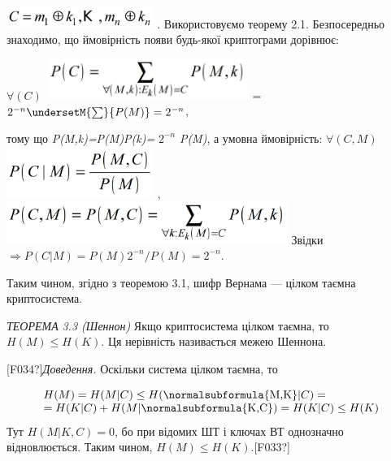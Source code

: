  \includegraphics[width=1.8819in,height=0.2791in]{crypt-img/crypt-img34.png} . 
Використовуємо теорему 2.1. Безпосередньо знаходимо, що ймовірність появи
будь-якої криптограми дорівнює:

{\centering
 $\forall (C)$  
\includegraphics[width=2.5984in,height=0.5189in]{crypt-img/crypt-img35.png} =
$2^{-n}\undersetM{\sum }{P(M)}=2^{-n}$,
\par}

{\centering
тому що
\textit{P}\textit{(}\textit{M}\textit{,}\textit{k}\textit{)=}\textit{P}\textit{(}\textit{M}\textit{)}\textit{P}\textit{(}\textit{k}\textit{)=}
$2^{-n}$ \textit{P}\textit{(}\textit{M}\textit{)},  а  умовна ймовірність: 
$\forall (C,M)$  
\includegraphics[width=1.8862in,height=0.661in]{crypt-img/crypt-img36.png} ,  
\includegraphics[width=3.602in,height=0.539in]{crypt-img/crypt-img37.png} 
Звідки  $\Rightarrow P(C|M)=P(M)2^{-n}/P(M)=2^{-n}$. 
\par}

Таким чином, згідно з теоремою 3.1, шифр Вернама --- цілком таємна криптосистема.


\bigskip

\textit{ТЕОРЕМА }\textit{3}\textit{.3 (Шеннон)} Якщо криптосистема цілком
таємна, то  $H(M)\le H(K)$. Ця нерівність називається межею Шеннона.

\textlatin{[F034?]}\textit{Доведення.} Оскільки система цілком таємна, то 

\begin{equation*}
\begin{matrix}{H(M)=H(M|C)\le H(\normalsubformula{\text{M,K}}|C)=}\hfill\null
\\{=H(K|C)+H(M|\normalsubformula{\text{K,C}})=H(K|C)\le H({K})}\hfill\null
\end{matrix}\hfill 
\end{equation*}
Тут   $H(M|K,C)=0$, бо при відомих ШТ і  ключах ВТ однозначно відновлюється. 
Таким чином,   $H(M)\le H(K)$.\textlatin{[F033?]}

